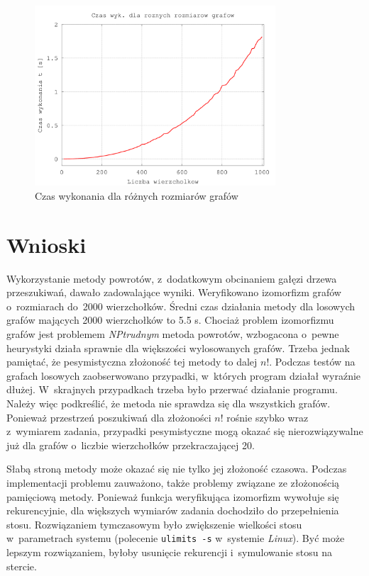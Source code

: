 \documentclass[12pt, a4paper, ]{article} %
\begin{document}
\begin{figure}[!ht]
    \centering
    \includegraphics[width=0.8\textwidth]{rys2}
    \caption{Czas wykonania dla różnych rozmiarów grafów}
    \label{fig:rys2}
\end{figure}
\clearpage

\section{Wnioski}
Wykorzystanie metody powrotów, z~dodatkowym obcinaniem gałęzi drzewa przeszukiwań, dawało
zadowalające wyniki. Weryfikowano izomorfizm grafów o~rozmiarach do~2000 wierzchołków. Średni
czas działania metody dla losowych grafów mających 2000 wierzchołków to 5.5 s.
Chociaż problem izomorfizmu grafów jest problemem \emph{NP\dywiz trudnym} metoda powrotów,
wzbogacona o~pewne heurystyki działa sprawnie dla większości wylosowanych grafów.
Trzeba jednak pamiętać, że pesymistyczna złożoność tej metody to dalej $n!$. Podczas testów
na grafach losowych zaobserwowano przypadki, w~których program działał wyraźnie dłużej.
W~skrajnych przypadkach trzeba było przerwać działanie programu. Należy więc
podkreślić, że metoda nie sprawdza się dla wszystkich grafów. Ponieważ
przestrzeń poszukiwań dla złożoności $n!$ rośnie szybko wraz z~wymiarem
zadania, przypadki pesymistyczne mogą okazać się nierozwiązywalne już dla
grafów o~liczbie wierzchołków przekraczającej 20.

Słabą stroną metody może okazać się nie tylko jej złożoność czasowa. Podczas implementacji problemu
zauważono, także problemy związane ze złożonością pamięciową metody. Ponieważ funkcja
weryfikująca izomorfizm wywołuje się rekurencyjnie, dla większych wymiarów zadania dochodziło do
przepełnienia stosu.  Rozwiązaniem tymczasowym było zwiększenie wielkości stosu
w~parametrach systemu (polecenie \texttt{ulimits -s} w~systemie \textit{Linux}).
Być może lepszym rozwiązaniem, byłoby usunięcie rekurencji i~symulowanie stosu
na stercie.




\nocite{*}
{}
\clearpage

\end{document}
